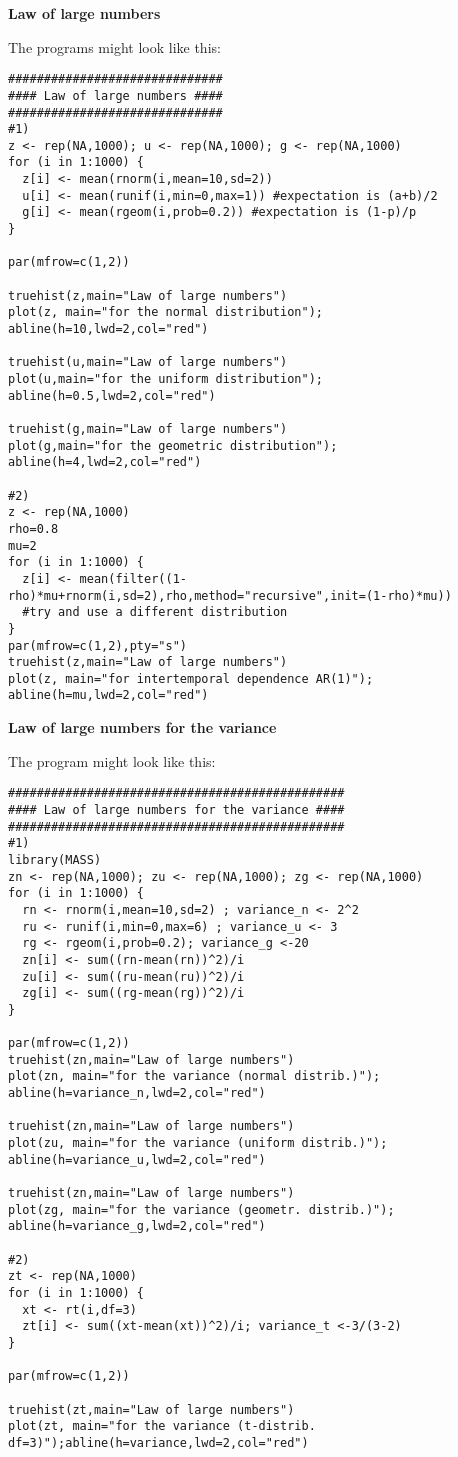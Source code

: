 \begin{Solution}{9.1}
\textbf{Law of large numbers}

The programs might look like this:
\begin{verbatim}
##############################
#### Law of large numbers ####
##############################
#1)
z <- rep(NA,1000); u <- rep(NA,1000); g <- rep(NA,1000)
for (i in 1:1000) {
  z[i] <- mean(rnorm(i,mean=10,sd=2))
  u[i] <- mean(runif(i,min=0,max=1)) #expectation is (a+b)/2
  g[i] <- mean(rgeom(i,prob=0.2)) #expectation is (1-p)/p
}

par(mfrow=c(1,2))

truehist(z,main="Law of large numbers")
plot(z, main="for the normal distribution"); abline(h=10,lwd=2,col="red")

truehist(u,main="Law of large numbers")
plot(u,main="for the uniform distribution"); abline(h=0.5,lwd=2,col="red")

truehist(g,main="Law of large numbers")
plot(g,main="for the geometric distribution"); abline(h=4,lwd=2,col="red")

#2)
z <- rep(NA,1000)
rho=0.8
mu=2
for (i in 1:1000) {
  z[i] <- mean(filter((1-rho)*mu+rnorm(i,sd=2),rho,method="recursive",init=(1-rho)*mu))
  #try and use a different distribution
}
par(mfrow=c(1,2),pty="s")
truehist(z,main="Law of large numbers")
plot(z, main="for intertemporal dependence AR(1)"); abline(h=mu,lwd=2,col="red")
\end{verbatim}
\end{Solution}
\begin{Solution}{9.2}
\textbf{Law of large numbers for the variance}

The program might look like this:
\begin{verbatim}
###############################################
#### Law of large numbers for the variance ####
###############################################
#1)
library(MASS)
zn <- rep(NA,1000); zu <- rep(NA,1000); zg <- rep(NA,1000)
for (i in 1:1000) {
  rn <- rnorm(i,mean=10,sd=2) ; variance_n <- 2^2
  ru <- runif(i,min=0,max=6) ; variance_u <- 3
  rg <- rgeom(i,prob=0.2); variance_g <-20
  zn[i] <- sum((rn-mean(rn))^2)/i
  zu[i] <- sum((ru-mean(ru))^2)/i
  zg[i] <- sum((rg-mean(rg))^2)/i
}

par(mfrow=c(1,2))
truehist(zn,main="Law of large numbers")
plot(zn, main="for the variance (normal distrib.)"); abline(h=variance_n,lwd=2,col="red")

truehist(zn,main="Law of large numbers")
plot(zu, main="for the variance (uniform distrib.)"); abline(h=variance_u,lwd=2,col="red")

truehist(zn,main="Law of large numbers")
plot(zg, main="for the variance (geometr. distrib.)"); abline(h=variance_g,lwd=2,col="red")

#2)
zt <- rep(NA,1000)
for (i in 1:1000) {
  xt <- rt(i,df=3)
  zt[i] <- sum((xt-mean(xt))^2)/i; variance_t <-3/(3-2)
}

par(mfrow=c(1,2))

truehist(zt,main="Law of large numbers")
plot(zt, main="for the variance (t-distrib. df=3)");abline(h=variance,lwd=2,col="red")
\end{verbatim}
\end{Solution}
